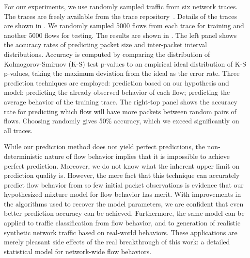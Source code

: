 \documentclass{acm_proc_article-sp}
\begin{document}
For our experiments, we use randomly sampled traffic from six network traces.
The traces are freely available from the  trace repository~\cite{Yeo06}.
Details of the traces are shown in .
We randomly sampled 5000 flows from each trace for training and another 5000 flows for testing.
The results are shown in .
The left panel shows the accuracy rates of predicting packet size and inter-packet interval distributions.
Accuracy is computed by comparing the distribution of Kolmogorov-Smirnov (K-S) test p-values to an empirical ideal distribution of K-S p-values, taking the maximum deviation from the ideal as the error rate.
Three prediction techniques are employed:
prediction based on our hypothesis and model;
predicting the already observed behavior of each flow;
predicting the average behavior of the training trace.
The right-top panel shows the accuracy rate for predicting which flow will have more packets between random pairs of flows.
Choosing randomly gives 50\% accuracy, which we exceed significantly on all traces.

While our prediction method does not yield perfect predictions, the non-deterministic nature of flow behavior implies that it is impossible to achieve perfect prediction.
Moreover, we do not know what the inherent upper limit on prediction quality is.
However, the mere fact that this technique can accurately predict flow behavior from so few initial packet observations is evidence that our hypothesized mixture model for flow behavior has merit.
With improvements in the algorithms used to recover the model parameters, we are confident that even better prediction accuracy can be achieved.
Furthermore, the same model can be applied to traffic classification from flow behavior, and to generation of realistic synthetic network traffic based on real-world behaviors.
These applications are merely pleasant side effects of the real breakthrough of this work:
a detailed statistical model for network-wide flow behaviors.

\vspace{-0.15em}
\scriptsize


\end{document}
